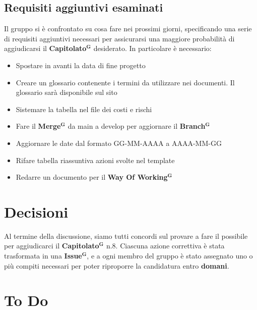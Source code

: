 \documentclass[a4paper,12pt]{article}
\newcommand{\term}[1]{\textbf{#1}$^\mathbf{G}$}
\begin{document}
\subsection{Requisiti aggiuntivi esaminati}
Il gruppo si è confrontato su cosa fare nei prossimi giorni, specificando una serie di requisiti aggiuntivi necessari per assicurarsi una maggiore probabilità di aggiudicarsi il \term{Capitolato} desiderato. In particolare è necessario:
\begin{itemize}
\item{Spostare in avanti la data di fine progetto}
\item{Creare un glossario contenente i termini da utilizzare nei documenti. Il glossario sarà disponibile sul sito}
\item{Sistemare la tabella nel file dei costi e rischi}
\item{Fare il \term{Merge} da main a develop per aggiornare il \term{Branch}}
\item{Aggiornare le date dal formato GG-MM-AAAA a AAAA-MM-GG}
\item{Rifare tabella riassuntiva azioni svolte nel template}
\item{Redarre un documento per il \term{Way Of Working}}
\end{itemize}
\section{Decisioni}
Al termine della discussione, siamo tutti concordi sul provare a fare il possibile per aggiudicarci il \term{Capitolato} n.8. Ciascuna azione correttiva è stata trasformata in una \term{Issue}, e a ogni membro del gruppo è stato assegnato uno o più compiti necessari per poter riproporre la candidatura entro \textbf{domani}.  

\section{To Do}
\end{document}
